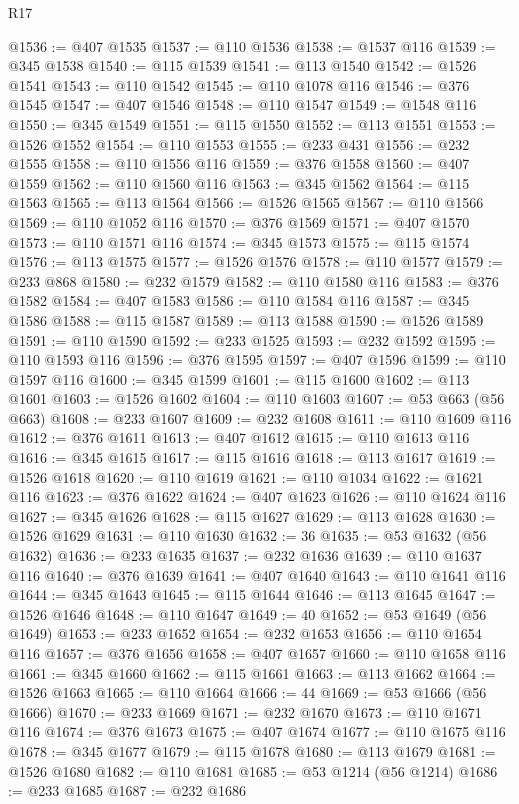 \begin{lexlean}{R17}
\begin{coremodule}
@1536 := @407 @1535
@1537 := @110 @1536
@1538 := @1537 @116
@1539 := @345 @1538
@1540 := @115 @1539
@1541 := @113 @1540
@1542 := @1526 @1541
@1543 := @110 @1542
@1545 := @110 @1078 @116
@1546 := @376 @1545
@1547 := @407 @1546
@1548 := @110 @1547
@1549 := @1548 @116
@1550 := @345 @1549
@1551 := @115 @1550
@1552 := @113 @1551
@1553 := @1526 @1552
@1554 := @110 @1553
@1555 := @233 @431
@1556 := @232 @1555
@1558 := @110 @1556 @116
@1559 := @376 @1558
@1560 := @407 @1559
@1562 := @110 @1560 @116
@1563 := @345 @1562
@1564 := @115 @1563
@1565 := @113 @1564
@1566 := @1526 @1565
@1567 := @110 @1566
@1569 := @110 @1052 @116
@1570 := @376 @1569
@1571 := @407 @1570
@1573 := @110 @1571 @116
@1574 := @345 @1573
@1575 := @115 @1574
@1576 := @113 @1575
@1577 := @1526 @1576
@1578 := @110 @1577
@1579 := @233 @868
@1580 := @232 @1579
@1582 := @110 @1580 @116
@1583 := @376 @1582
@1584 := @407 @1583
@1586 := @110 @1584 @116
@1587 := @345 @1586
@1588 := @115 @1587
@1589 := @113 @1588
@1590 := @1526 @1589
@1591 := @110 @1590
@1592 := @233 @1525
@1593 := @232 @1592
@1595 := @110 @1593 @116
@1596 := @376 @1595
@1597 := @407 @1596
@1599 := @110 @1597 @116
@1600 := @345 @1599
@1601 := @115 @1600
@1602 := @113 @1601
@1603 := @1526 @1602
@1604 := @110 @1603
@1607 := @53 @663 (@56 @663)
@1608 := @233 @1607
@1609 := @232 @1608
@1611 := @110 @1609 @116
@1612 := @376 @1611
@1613 := @407 @1612
@1615 := @110 @1613 @116
@1616 := @345 @1615
@1617 := @115 @1616
@1618 := @113 @1617
@1619 := @1526 @1618
@1620 := @110 @1619
@1621 := @110 @1034
@1622 := @1621 @116
@1623 := @376 @1622
@1624 := @407 @1623
@1626 := @110 @1624 @116
@1627 := @345 @1626
@1628 := @115 @1627
@1629 := @113 @1628
@1630 := @1526 @1629
@1631 := @110 @1630
@1632 := 36
@1635 := @53 @1632 (@56 @1632)
@1636 := @233 @1635
@1637 := @232 @1636
@1639 := @110 @1637 @116
@1640 := @376 @1639
@1641 := @407 @1640
@1643 := @110 @1641 @116
@1644 := @345 @1643
@1645 := @115 @1644
@1646 := @113 @1645
@1647 := @1526 @1646
@1648 := @110 @1647
@1649 := 40
@1652 := @53 @1649 (@56 @1649)
@1653 := @233 @1652
@1654 := @232 @1653
@1656 := @110 @1654 @116
@1657 := @376 @1656
@1658 := @407 @1657
@1660 := @110 @1658 @116
@1661 := @345 @1660
@1662 := @115 @1661
@1663 := @113 @1662
@1664 := @1526 @1663
@1665 := @110 @1664
@1666 := 44
@1669 := @53 @1666 (@56 @1666)
@1670 := @233 @1669
@1671 := @232 @1670
@1673 := @110 @1671 @116
@1674 := @376 @1673
@1675 := @407 @1674
@1677 := @110 @1675 @116
@1678 := @345 @1677
@1679 := @115 @1678
@1680 := @113 @1679
@1681 := @1526 @1680
@1682 := @110 @1681
@1685 := @53 @1214 (@56 @1214)
@1686 := @233 @1685
@1687 := @232 @1686

\end{coremodule}
\end{lexlean}
